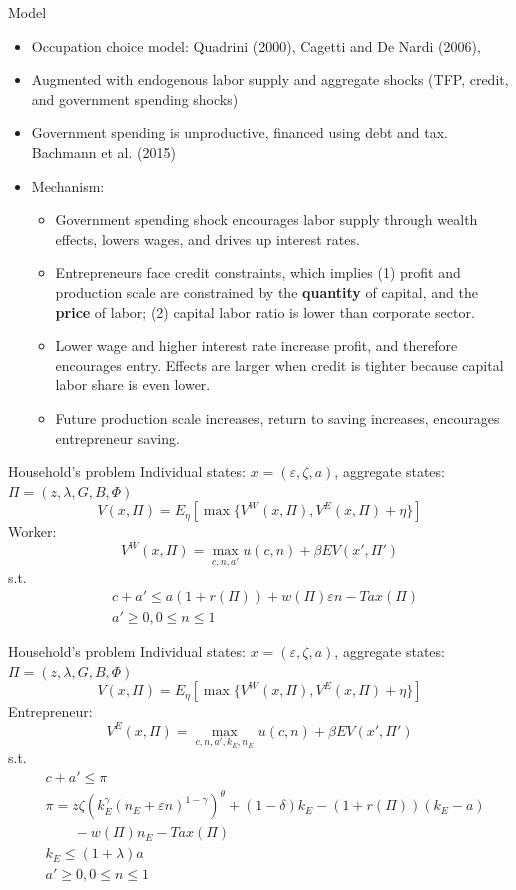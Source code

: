 \documentclass[svgnames]{beamer}
\begin{document}
\begin{frame}{Model}
\begin{itemize}
\item Occupation choice model: Quadrini (2000), Cagetti and De Nardi (2006), \citet{buera_finance_2011}
\item Augmented with endogenous labor supply and aggregate shocks (TFP, credit, and government spending shocks)
\item Government spending is unproductive, financed using debt and tax. Bachmann et al. (2015)
\item Mechanism:
\begin{itemize}
\item Government spending shock encourages labor supply through wealth effects, lowers wages, and drives up interest rates.
\item Entrepreneurs face credit constraints, which implies (1) profit and production scale are constrained by the {\bf quantity} of capital, and the {\bf price} of labor; (2) capital labor ratio is lower than corporate sector.
\item Lower wage and higher interest rate increase profit, and therefore encourages entry. Effects are larger when credit is tighter because capital labor share is even lower.
\item Future production scale increases, return to saving increases, encourages entrepreneur saving.
\end{itemize}
\end{itemize}
\end{frame}

\begin{frame}{Household's problem}
Individual states: $x=(\varepsilon,\zeta,a)$, aggregate states: $\Pi=(z,\lambda,G,B,\Phi)$
$$
V(x,\Pi)=E_{\eta}[\max \{V^W(x,\Pi),V^E(x,\Pi)+\eta\}]
$$
Worker:
$$
V^W(x,\Pi)=\max_{c,n,a'}u(c,n)+\beta EV(x',\Pi')
$$
s.t.
$$
\begin{aligned}
& c+a' \leq a(1+r(\Pi)) + w(\Pi)\varepsilon n - Tax(\Pi)\\
& a'\geq 0,0\leq n\leq 1
\end{aligned}
$$
\end{frame}

\begin{frame}{Household's problem}
Individual states: $x=(\varepsilon,\zeta,a)$, aggregate states: $\Pi=(z,\lambda,G,B,\Phi)$
$$
V(x,\Pi)=E_{\eta}[\max \{V^W(x,\Pi),V^E(x,\Pi)+\eta\}]
$$
Entrepreneur:
$$
V^E(x,\Pi)=\max_{c,n,a',k_E,n_E}u(c,n)+\beta EV(x',\Pi')
$$
s.t.
$$
\begin{aligned}
& c+a' \leq \pi\\
& \pi= z \zeta (k_E^{\gamma}(n_E+\varepsilon n)^{1-\gamma})^{\theta} + (1-\delta)k_E - (1+r(\Pi))(k_E-a) \\
& \quad \quad - w(\Pi)n_E - Tax(\Pi)\\
& k_E \leq (1+\lambda)a \\
& a'\geq 0,0\leq n\leq 1
\end{aligned}
$$
\end{frame}
\end{document}
